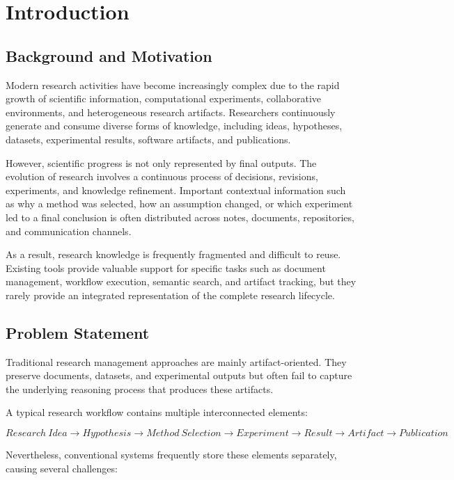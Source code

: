 \section{Introduction}
\label{sec:introduction}

\subsection{Background and Motivation}

Modern research activities have become increasingly complex due to the rapid growth of scientific information, computational experiments, collaborative environments, and heterogeneous research artifacts. Researchers continuously generate and consume diverse forms of knowledge, including ideas, hypotheses, datasets, experimental results, software artifacts, and publications.

However, scientific progress is not only represented by final outputs. The evolution of research involves a continuous process of decisions, revisions, experiments, and knowledge refinement. Important contextual information such as why a method was selected, how an assumption changed, or which experiment led to a final conclusion is often distributed across notes, documents, repositories, and communication channels.

As a result, research knowledge is frequently fragmented and difficult to reuse. Existing tools provide valuable support for specific tasks such as document management, workflow execution, semantic search, and artifact tracking, but they rarely provide an integrated representation of the complete research lifecycle.

\subsection{Problem Statement}

Traditional research management approaches are mainly artifact-oriented. They preserve documents, datasets, and experimental outputs but often fail to capture the underlying reasoning process that produces these artifacts.

A typical research workflow contains multiple interconnected elements:

\[
Research\ Idea
\rightarrow
Hypothesis
\rightarrow
Method\ Selection
\rightarrow
Experiment
\rightarrow
Result
\rightarrow
Artifact
\rightarrow
Publication
\]

Nevertheless, conventional systems frequently store these elements separately, causing several challenges:

